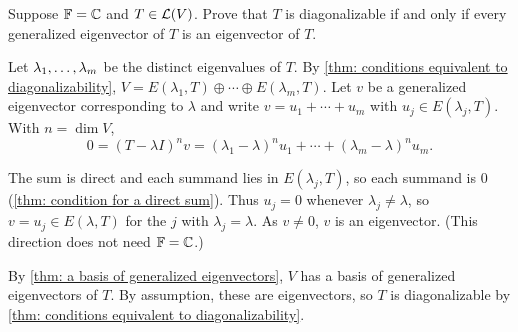 \begin{xrcs}
  Suppose $\mathbb{F} = \mathbb{C}$ and $T \in \mathcal{L}(V)$. Prove that $T$ is diagonalizable if and only if every generalized eigenvector of $T$ is an eigenvector of $T$.

\begin{xprf}
  \Rightarrowdirection Let $\lambda_1, \dots, \lambda_m$ be the distinct eigenvalues of $T$. By \ref{thm: conditions equivalent to diagonalizability}, $V = E(\lambda_1, T) \oplus \cdots \oplus E(\lambda_m, T)$. Let $v$ be a generalized eigenvector corresponding to $\lambda$ and write $v = u_1 + \cdots + u_m$ with $u_j \in E(\lambda_j, T)$. With $n = \dim V$,
  \begin{equation}
    0 = (T - \lambda I)^n v = (\lambda_1 - \lambda)^n u_1 + \cdots + (\lambda_m - \lambda)^n u_m.
  \end{equation}

  The sum is direct and each summand lies in $E(\lambda_j, T)$, so each summand is $0$ (\ref{thm: condition for a direct sum}). Thus $u_j = 0$ whenever $\lambda_j \neq \lambda$, so $v = u_j \in E(\lambda, T)$ for the $j$ with $\lambda_j = \lambda$. As $v \neq 0$, $v$ is an eigenvector. (This direction does not need $\mathbb{F} = \mathbb{C}$.)

  \Leftarrowdirection By \ref{thm: a basis of generalized eigenvectors}, $V$ has a basis of generalized eigenvectors of $T$. By assumption, these are eigenvectors, so $T$ is diagonalizable by \ref{thm: conditions equivalent to diagonalizability}.
\end{xprf}
\end{xrcs}

